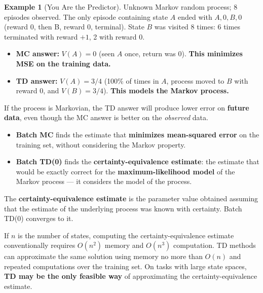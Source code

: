 \documentclass[11pt,a4paper]{article}
\theoremstyle{definition}
\newtheorem{example}{Example}[section]
\theoremstyle{plain}
\theoremstyle{remark}
\begin{document}
\begin{example}[You Are the Predictor]
Unknown Markov random process; 8 episodes observed. The only episode containing state $A$ ended with $A, 0, B, 0$ (reward 0, then B, reward 0, terminal). State $B$ was visited 8 times: 6 times terminated with reward $+1$, 2 with reward $0$.
\begin{itemize}
    \item \textbf{MC answer:} $V(A) = 0$ (seen $A$ once, return was 0). \textbf{This minimizes MSE on the training data.}
    \item \textbf{TD answer:} $V(A) = 3/4$ (100\% of times in $A$, process moved to $B$ with reward 0, and $V(B) = 3/4$). \textbf{This models the Markov process.}
\end{itemize}
If the process is Markovian, the TD answer will produce lower error on \textbf{future data}, even though the MC answer is better on the \textit{observed} data.
\end{example}

\begin{tcolorbox}[colback=blue!5!white, colframe=blue!60!black, title={Batch MC vs Batch TD(0)}]
\begin{itemize}
    \item \textbf{Batch MC} finds the estimate that \textbf{minimizes mean-squared error} on the training set, without considering the Markov property.
    \item \textbf{Batch TD(0)} finds the \textbf{certainty-equivalence estimate}: the estimate that would be exactly correct for the \textbf{maximum-likelihood model} of the Markov process — it considers the model of the process.
\end{itemize}
\end{tcolorbox}

The \textbf{certainty-equivalence estimate} is the parameter value obtained assuming that the estimate of the underlying process was known with certainty. Batch TD(0) converges to it.

\begin{tcolorbox}[colback=green!5!white, colframe=green!60!black]
If $n$ is the number of states, computing the certainty-equivalence estimate conventionally requires $O(n^2)$ memory and $O(n^3)$ computation. TD methods can approximate the same solution using memory no more than $O(n)$ and repeated computations over the training set. On tasks with large state spaces, \textbf{TD may be the only feasible way} of approximating the certainty-equivalence estimate.
\end{tcolorbox}
\end{document}
